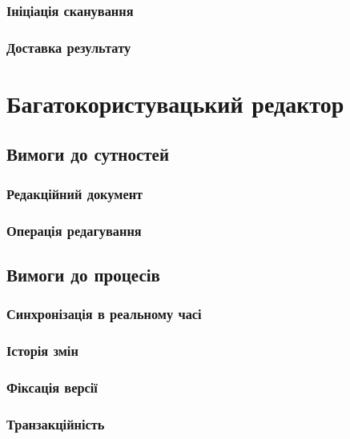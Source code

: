 \subsubsection{Ініціація сканування}

\subsubsection{Доставка результату}

\newpage
\section{Багатокористувацький редактор}

\subsection{Вимоги до сутностей}

\subsubsection{Редакційний документ}

\subsubsection{Операція редагування}

\subsection{Вимоги до процесів}

\subsubsection{Синхронізація в реальному часі}

\subsubsection{Історія змін}

\subsubsection{Фіксація версії}

\subsubsection{Транзакційність}

